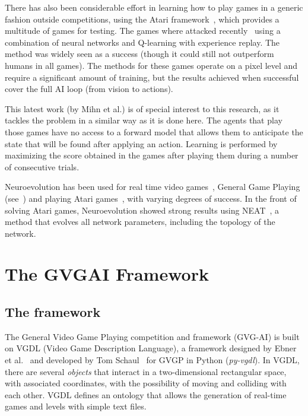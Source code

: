 \documentclass[conference]{IEEEtran}
\begin{document}
There has also been considerable effort in learning how to play games in a generic fashion outside competitions,  using the Atari framework~\cite{13jair}, which provides a multitude of games for testing. The games where attacked recently~\cite{mnih2015human} using a combination of neural networks and Q-learning with experience replay. The method was widely seen as a success (though it could still not outperform humans in all games). The methods for these games operate on a pixel level and require a significant amount of training, but the results achieved when successful cover the full AI loop (from vision to actions). 

This latest work (by Mihn et al.) is of special interest to this research, as it tackles the problem in a similar way as it is done here. The agents that play those games have no access to a forward model that allows them to anticipate the state that will be found after applying an action. Learning is performed by maximizing the score obtained in the games after playing them during a number of consecutive trials. 

Neuroevolution has been used for real time video games~\cite{stanley2005real},  General Game Playing (see~\cite{reisinger2007coevolving}) and playing Atari games~\cite{hausknecht2012hyperneat}, with varying degrees of success. In the front of solving Atari games, Neuroevolution showed strong results using NEAT~\cite{stanley2002efficient}, a method that evolves all network parameters, including the topology of the network. 



\section{The GVGAI Framework} \label{sec:framework}


\subsection{The framework} \label{ssec:framework}

The General Video Game Playing competition and framework (GVG-AI) is built on VGDL (Video Game Description Language), a framework designed by Ebner et al.~\cite{Ebner2013} and developed by Tom Schaul~\cite{schaul2013pyvgdl} for GVGP in Python (\textit{py-vgdl}). In VGDL, there are several \textit{objects} that interact in a two-dimensional rectangular space, with associated coordinates, with the possibility of moving and colliding with each other. VGDL defines an ontology that allows the generation of real-time games and levels with simple text files.
\end{document}
